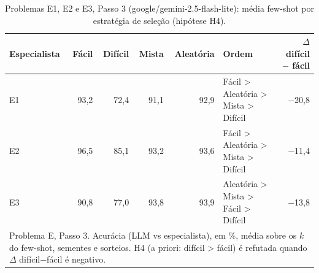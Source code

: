 \begin{table}[htbp]
\centering
\small
\caption{Problemas E1, E2 e E3, Passo 3 (google/gemini-2.5-flash-lite): média few-shot por estratégia de seleção (hipótese H4).}
\label{tab:bloco2_E_passo3_H4_flashlite}
\begin{tabular}{lrrrrlr}
\toprule
Especialista & Fácil & Difícil & Mista & Aleatória & Ordem & $\Delta$ difícil $-$ fácil \\
\midrule
E1 & 93,2 & 72,4 & 91,1 & 92,9 & Fácil > Aleatória > Mista > Difícil & $-$20,8 \\
E2 & 96,5 & 85,1 & 93,2 & 93,6 & Fácil > Aleatória > Mista > Difícil & $-$11,4 \\
E3 & 90,8 & 77,0 & 93,8 & 93,9 & Aleatória > Mista > Fácil > Difícil & $-$13,8 \\
\bottomrule
\multicolumn{7}{p{0.95\linewidth}}{\footnotesize Problema E, Passo 3. Acurácia (LLM vs especialista), em \%, média sobre os $k$ do few-shot, sementes e sorteios. H4 (a priori: difícil > fácil) é refutada quando $\Delta$ difícil$-$fácil é negativo.} \\
\end{tabular}
\end{table}
